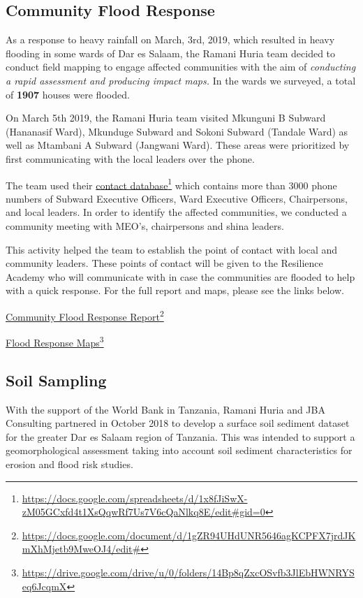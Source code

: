 \documentclass[a4paper,12pt,twoside]{article}
\begin{document}
\begin{multicols}{2}
\subsection{Community Flood Response}
As a response to heavy rainfall on March, 3rd, 2019, which resulted in heavy flooding in some wards of Dar es Salaam, the Ramani Huria team decided to conduct field mapping to engage affected communities with the aim of \textit{conducting a rapid assessment and producing impact maps.} In the wards we surveyed, a total of \textbf{1907} houses were flooded.

On March 5th 2019, the Ramani Huria team visited Mkunguni B Subward (Hananasif Ward), Mkunduge Subward and Sokoni Subward (Tandale Ward) as well as Mtambani A Subward (Jangwani Ward). These areas were prioritized by first communicating with the local leaders over the phone. 

The team used their \href{https://docs.google.com/spreadsheets/d/1x8fJiSwX-zM05GCxfd4t1XsQqwRf7Us7V6cQaNlkq8E/edit#gid=0}{contact database}\footnote{\url{https://docs.google.com/spreadsheets/d/1x8fJiSwX-zM05GCxfd4t1XsQqwRf7Us7V6cQaNlkq8E/edit#gid=0}} which contains more than 3000 phone numbers of Subward Executive Officers, Ward Executive Officers, Chairpersons, and local leaders. In order to identify the affected communities, we conducted a community meeting with MEO’s, chairpersons and shina leaders.

This activity helped the team to establish the point of contact with local and community leaders. These points of contact will be given to the Resilience Academy who will communicate with in case the communities are flooded to help with a quick response. For the full report and maps, please see the links below. 

\href{https://docs.google.com/document/d/1gZR94UHdUNR5646agKCPFX7jrdJKmXhMjetb9MweOJ4/edit#}{Community Flood Response Report}\footnote{\url{https://docs.google.com/document/d/1gZR94UHdUNR5646agKCPFX7jrdJKmXhMjetb9MweOJ4/edit#}}

\href{https://drive.google.com/drive/u/0/folders/14Bp8qZxcOSvfb3JlEbHWNRYSeq6JcqmX}{Flood Response Maps}\footnote{\url{https://drive.google.com/drive/u/0/folders/14Bp8qZxcOSvfb3JlEbHWNRYSeq6JcqmX}}

\subsection{Soil Sampling}
With the support of the World Bank in Tanzania, Ramani Huria and JBA Consulting partnered in October 2018 to develop a surface soil sediment dataset for the greater Dar es Salaam region of Tanzania. This was intended to support a geomorphological assessment taking into account soil sediment characteristics for erosion and flood risk studies.



\end{multicols}
\end{document}
